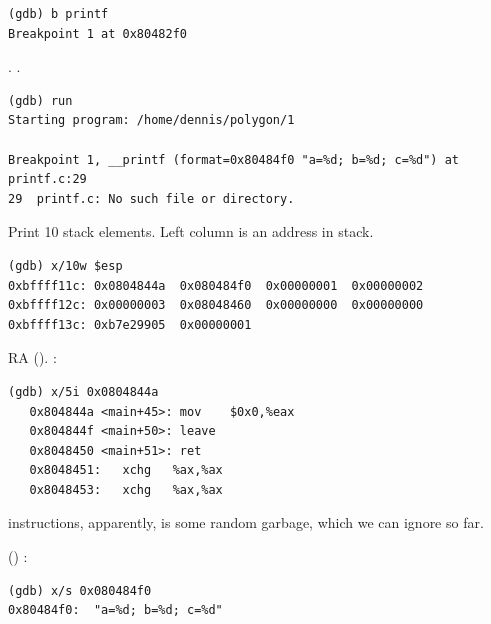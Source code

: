 \begin{lstlisting}[caption=\IFRU{установим брякпойнт на}{let's set breakpoint on} \printf]
(gdb) b printf
Breakpoint 1 at 0x80482f0
\end{lstlisting}

.
 \printf 
{}.

\begin{lstlisting}
(gdb) run
Starting program: /home/dennis/polygon/1 

Breakpoint 1, __printf (format=0x80484f0 "a=%d; b=%d; c=%d") at printf.c:29
29	printf.c: No such file or directory.
\end{lstlisting}

{Print 10 stack elements. Left column is an address in stack.}

\begin{lstlisting}
(gdb) x/10w $esp
0xbffff11c:	0x0804844a	0x080484f0	0x00000001	0x00000002
0xbffff12c:	0x00000003	0x08048460	0x00000000	0x00000000
0xbffff13c:	0xb7e29905	0x00000001
\end{lstlisting}

 \ac{RA} ().
:

\begin{lstlisting}
(gdb) x/5i 0x0804844a
   0x804844a <main+45>:	mov    $0x0,%eax
   0x804844f <main+50>:	leave  
   0x8048450 <main+51>:	ret    
   0x8048451:	xchg   %ax,%ax
   0x8048453:	xchg   %ax,%ax
\end{lstlisting}

  
{instructions, apparently, is some random garbage, which we can ignore so far}.

 () :

\begin{lstlisting}
(gdb) x/s 0x080484f0
0x80484f0:	"a=%d; b=%d; c=%d"
\end{lstlisting}

